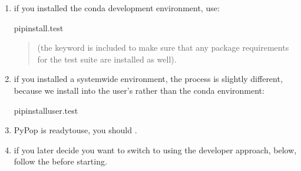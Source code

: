 \documentclass[letterpaper,10pt,english,openany,oneside]{sphinxmanual}
\begin{document}
\begin{enumerate}
%
\item {} 
\sphinxAtStartPar
if you installed the conda development environment, use:

\begin{sphinxVerbatim}[commandchars=\\\{\}]
pipinstall.\PYG{o}{[}test\PYG{o}{]}
\end{sphinxVerbatim}
\begin{quote}

\sphinxAtStartPar
(the \sphinxcode{\sphinxupquote{{[}test{]}}} keyword is included to make sure that any package
requirements for the test suite are installed as well).
\end{quote}

\item {} 
\sphinxAtStartPar
if you installed a system\sphinxhyphen{}wide environment, the process is slightly
different, because we install into the user’s  rather
than the conda environment:

\begin{sphinxVerbatim}[commandchars=\\\{\}]
pipinstall\PYGZhy{}\PYGZhy{}user.\PYG{o}{[}test\PYG{o}{]}
\end{sphinxVerbatim}

\item {} 
\sphinxAtStartPar
PyPop is ready\sphinxhyphen{}to\sphinxhyphen{}use, you should {\hyperref[\detokenize{docs/guide-chapter-contributing:run-unit-tests-with-pytest}]{}}.

\item {} 
\sphinxAtStartPar
if you later decide you want to switch to using the developer
approach, below, follow the {\hyperref[\detokenize{docs/guide-chapter-contributing:cleaning-up-build}]{}} before
starting.

\end{enumerate}
\end{document}
